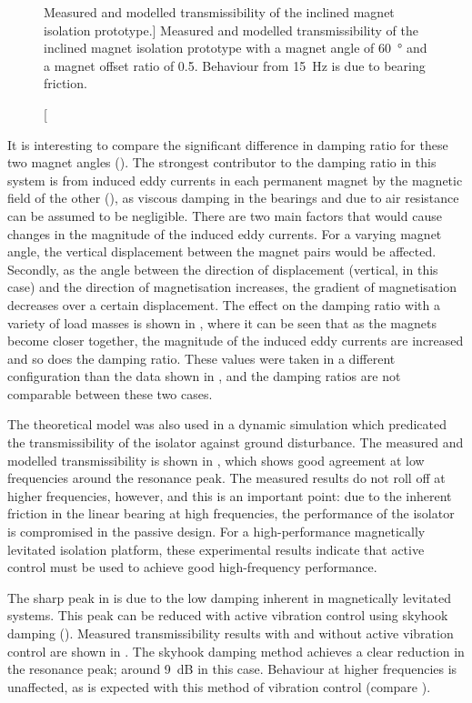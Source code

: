 \documentclass[11pt,a4paper]{memoir}
\begin{document}
\begin{figure}[t]
\caption
[Measured and modelled transmissibility of the inclined magnet isolation prototype.]
{Measured and modelled transmissibility of the inclined magnet isolation prototype with a magnet angle of \SI{60}{\degree} and a magnet offset ratio of \num{0.5}. Behaviour from \SI{15}{Hz} is due to bearing friction.}
\end{figure}

It is interesting to compare the significant difference in damping ratio for these two magnet angles ().
The strongest contributor to the damping ratio in this system is from induced eddy currents in each permanent magnet by the magnetic field of the other (), as viscous damping in the bearings and due to air resistance can be assumed to be negligible.
There are two main factors that would cause changes in the magnitude of the induced eddy currents.
For a varying magnet angle, the vertical displacement between the magnet pairs would be affected.
Secondly, as the angle between the direction of displacement (vertical, in this case) and the direction of magnetisation increases, the gradient of magnetisation decreases over a certain displacement.
The effect on the damping ratio with a variety of load masses is shown in , where it can be seen that as the magnets become closer together, the magnitude of the induced eddy currents are increased and so does the damping ratio.
These values were taken in a different configuration than the data shown in , and the damping ratios are not comparable between these two cases.

The theoretical model was also used in a dynamic simulation which predicated the transmissibility of the isolator against ground disturbance.
The measured and modelled transmissibility is shown in , which shows good agreement at low frequencies around the resonance peak.
The measured results do not roll off at higher frequencies, however, and this is an important point: due to the inherent friction in the linear bearing at high frequencies, the performance of the isolator is compromised in the passive design.
For a high-performance magnetically levitated isolation platform, these experimental results indicate that active control must be used to achieve good high-frequency performance.

The sharp peak in  is due to the low damping inherent in magnetically levitated systems.
This peak can be reduced with active vibration control using skyhook damping ().
Measured transmissibility results with and without active vibration control are shown in .
The skyhook damping method achieves a clear reduction in the resonance peak; around \SI{9}{dB} in this case.
Behaviour at higher frequencies is unaffected, as is expected with this method of vibration control (compare ).
\end{document}
